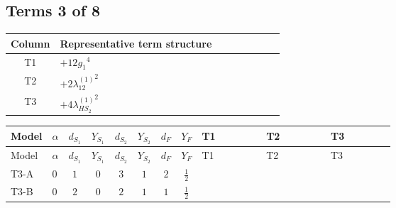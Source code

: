 \documentclass[8pt]{article}
\begin{document}
\begin{landscape}
\subsection*{Terms 3 of 8}
\begin{center}
\begin{tabular}{@{}c >{\raggedright\arraybackslash}p{0.82\linewidth}@{}}
\toprule
Column & Representative term structure \\
\midrule
T1 & \(\displaystyle +12 {g_1}^4\) \\
\midrule
T2 & \(\displaystyle +2 {\lambda_{12}^{(1)}}^2\) \\
\midrule
T3 & \(\displaystyle +4 {\lambda_{HS_2}^{(1)}}^2\) \\
\midrule
\bottomrule
\end{tabular}
\end{center}
\smallskip
\tiny
\begin{longtable}{@{}llcccccc >{\raggedright\arraybackslash}p{0.21\linewidth} >{\raggedright\arraybackslash}p{0.21\linewidth} >{\raggedright\arraybackslash}p{0.21\linewidth}@{}}
\toprule
Model & $\alpha$ & $d_{S_1}$ & $Y_{S_1}$ & $d_{S_2}$ & $Y_{S_2}$ & $d_F$ & $Y_F$ & T1 & T2 & T3 \\
\midrule
\endfirsthead
\toprule
Model & $\alpha$ & $d_{S_1}$ & $Y_{S_1}$ & $d_{S_2}$ & $Y_{S_2}$ & $d_F$ & $Y_F$ & T1 & T2 & T3 \\
\midrule
\endhead
T3-A & $0$ & $1$ & $0$ & $3$ & $1$ & $2$ & $\frac{1}{2}$ & \scriptsize\adjustbox{max width=\linewidth}{$\begin{gathered} +12 {g_1}^4\end{gathered}$} & \scriptsize\adjustbox{max width=\linewidth}{$\begin{gathered} +2 {\lambda_{12}^{(1)}}^2\end{gathered}$} & \scriptsize\adjustbox{max width=\linewidth}{$\begin{gathered} +4 {\lambda_{HS_2}^{(1)}}^2\end{gathered}$} \\
\midrule
T3-B & $0$ & $2$ & $0$ & $2$ & $1$ & $1$ & $\frac{1}{2}$ & \scriptsize\adjustbox{max width=\linewidth}{$\begin{gathered} +12 {g_1}^4\end{gathered}$} & \scriptsize\adjustbox{max width=\linewidth}{$\begin{gathered} +4 {\lambda_{12}^{(1)}}^2\end{gathered}$} & \scriptsize\adjustbox{max width=\linewidth}{$\begin{gathered} +4 {\lambda_{HS_2}^{(1)}}^2\end{gathered}$} \\

\end{longtable}
\end{landscape}
\end{document}

